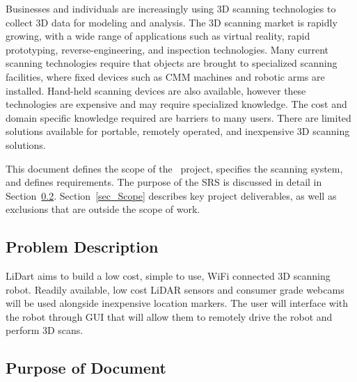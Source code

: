 \documentclass[12pt]{article}
\begin{document}

Businesses and individuals are increasingly using 3D scanning technologies to collect 3D data for modeling and analysis. The 3D scanning market is rapidly growing, with a wide range of applications such as virtual reality, rapid prototyping, reverse-engineering, and inspection technologies. Many current scanning technologies require that objects are brought to specialized scanning facilities, where fixed devices such as CMM machines and robotic arms are installed. Hand-held scanning devices are also available,  however these technologies are expensive and may require specialized knowledge. The cost and domain specific knowledge required are barriers to many users. There are limited solutions available for portable, remotely operated, and inexpensive 3D scanning solutions.  
\newline
\par
This document defines the scope of the \progname\ project, specifies the scanning system, and defines requirements. The purpose of the SRS is discussed in detail in Section~\ref{sec_purpose}.  Section~\ref{sec_Scope} describes key project deliverables, as well as exclusions that are outside the scope of work.
\subsection{Problem Description}

LiDart aims to build a low cost, simple to use, WiFi connected 3D scanning robot. Readily available, low cost LiDAR sensors and consumer grade webcams will be used alongside inexpensive location markers. The user will interface with the robot through GUI that will allow them
to remotely drive the robot and perform 3D scans.

\subsection{Purpose of Document}
\label{sec_purpose}

\end{document}
